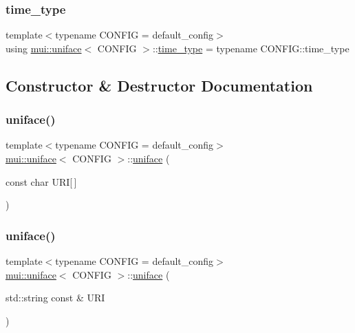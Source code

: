 \mbox{\label{classmui_1_1uniface_a65cbecf1936d7d61cb45f14b1138dc07}} 
\subsubsection{\texorpdfstring{time\+\_\+type}{time\_type}}
{\footnotesize\ttfamily template$<$typename C\+O\+N\+F\+IG  = default\+\_\+config$>$ \\
using \hyperlink{classmui_1_1uniface}{mui\+::uniface}$<$ C\+O\+N\+F\+IG $>$\+::\hyperlink{classmui_1_1uniface_a65cbecf1936d7d61cb45f14b1138dc07}{time\+\_\+type} =  typename C\+O\+N\+F\+I\+G\+::time\+\_\+type}



\subsection{Constructor \& Destructor Documentation}
\mbox{\label{classmui_1_1uniface_ae8b84ab8a58db4e2f1c8680499167c6d}} 
\subsubsection{\texorpdfstring{uniface()}{uniface()}\hspace{0.1cm}{\footnotesize\ttfamily [1/4]}}
{\footnotesize\ttfamily template$<$typename C\+O\+N\+F\+IG  = default\+\_\+config$>$ \\
\hyperlink{classmui_1_1uniface}{mui\+::uniface}$<$ C\+O\+N\+F\+IG $>$\+::\hyperlink{classmui_1_1uniface}{uniface} (\begin{DoxyParamCaption}\item[{const char}]{U\+RI\mbox{[}$\,$\mbox{]} }\end{DoxyParamCaption})\hspace{0.3cm}{\ttfamily [inline]}}

\mbox{\label{classmui_1_1uniface_a5c2dd9f396dd2f222b5caf6dd5adb522}} 
\subsubsection{\texorpdfstring{uniface()}{uniface()}\hspace{0.1cm}{\footnotesize\ttfamily [2/4]}}
{\footnotesize\ttfamily template$<$typename C\+O\+N\+F\+IG  = default\+\_\+config$>$ \\
\hyperlink{classmui_1_1uniface}{mui\+::uniface}$<$ C\+O\+N\+F\+IG $>$\+::\hyperlink{classmui_1_1uniface}{uniface} (\begin{DoxyParamCaption}\item[{std\+::string const \&}]{U\+RI }\end{DoxyParamCaption})\hspace{0.3cm}{\ttfamily [inline]}}

